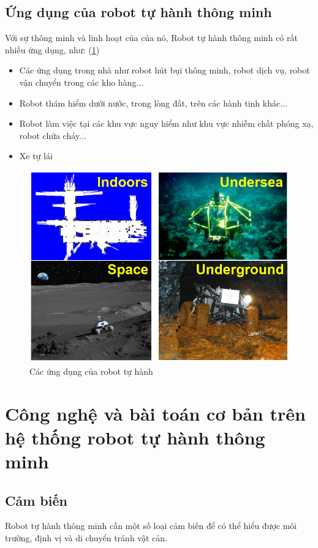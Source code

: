 \subsection{Ứng dụng của robot tự hành thông minh}
Với sự thông minh và linh hoạt của của nó, Robot tự hành thông minh có rất nhiều ứng dụng, như: (\figurename{\ref{fig:applications}})

\begin{itemize}
	\item Các ứng dụng trong nhà như robot hút bụi thông minh, robot dịch vụ, robot vận chuyển trong các kho hàng...
	\item Robot thám hiểm dưới nước, trong lòng đất, trên các hành tinh khác...
	\item Robot làm việc tại các khu vực nguy hiểm như khu vực nhiễm chất phóng xạ, robot chữa cháy...
	\item Xe tự lái
\end{itemize}

\begin{figure}
	\centering
	\includegraphics[width=13cm]{chapter1/figs/applications.PNG}
	\caption{Các ứng dụng của robot tự hành \cite{Burgard2010}}
	\label{fig:applications}
\end{figure}

\section{Công nghệ và bài toán cơ bản trên hệ thống robot tự hành thông minh}
\subsection{Cảm biến}
Robot tự hành thông minh cần một số loại cảm biến để có thể hiểu được môi trường, định vị và di chuyển tránh vật cản. 

